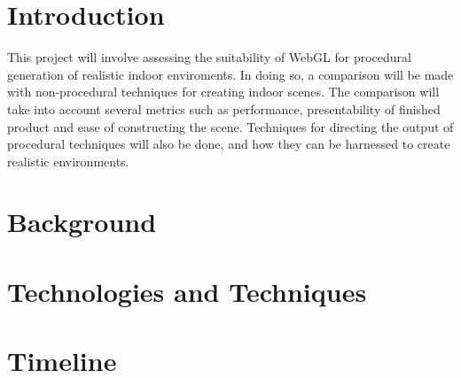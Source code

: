 \documentclass[12pt]{article}
\begin{document}
\maketitle

\clearpage

\section{Introduction}
This project will involve assessing the suitability of WebGL for procedural generation of realistic indoor enviroments. 
In doing so, a comparison will be made with non-procedural techniques for creating indoor scenes.
The comparison will take into account several metrics such as performance, presentability of finished product and ease of constructing the scene.
Techniques for directing the output of procedural techniques will also be done, and how they can be harnessed to create realistic environments.

\section{Background}

\section{Technologies and Techniques}

\section{Timeline}


%
\end{document}

